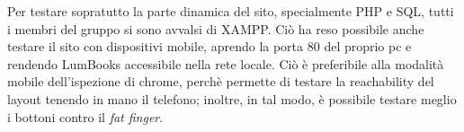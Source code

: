 Per testare sopratutto la parte dinamica del sito, specialmente PHP e SQL, tutti i membri del gruppo si sono avvalsi di XAMPP. Ciò ha reso possibile anche testare il sito con dispositivi mobile, aprendo la porta 80 del proprio pc e rendendo LumBooks accessibile nella rete locale. Ciò è preferibile alla modalità mobile dell'ispezione di chrome, perchè permette di testare la reachability del layout tenendo in mano il telefono; inoltre, in tal modo, è possibile testare meglio i bottoni contro il \textit{fat finger}.